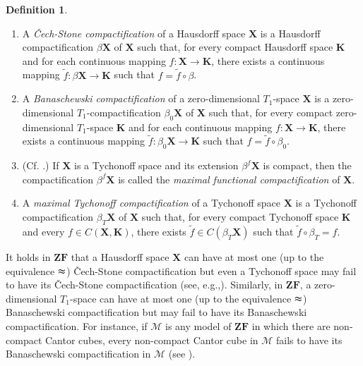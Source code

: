 \documentclass[12pt,twoside,leqno]{article}
\theoremstyle{plain}
\theoremstyle{definition}
\newtheorem{definition}[theorem]{Definition}
\theoremstyle{remark}
\begin{document}
\begin{definition}
	\label{s1:d24}
	\begin{enumerate}
		\item[(i)] A \emph{\v{C}ech-Stone compactification} of a Hausdorff space $\mathbf{X}$ is a Hausdorff
		compactification $\beta \mathbf{X}$ of $\mathbf{X}$ such that, for
		every compact Hausdorff space $\mathbf{K}$ and for each continuous mapping $%
		f:\mathbf{X}\rightarrow \mathbf{K}$, there exists a continuous mapping $\tilde{f}:\beta
		\mathbf{X}\rightarrow \mathbf{K}$ such that $f=\tilde{f}\circ \beta $.
		
		\item[(ii)]  A \emph{Banaschewski compactification} of a zero-dimensional $T_1$-space $\mathbf{X}$ is a zero-dimen\-sional
		$T_1$-compactification $ \beta_0 \mathbf{X} $ of $\mathbf{X}$ such that, for
		every compact zero-dimensional $T_1$-space $\mathbf{K}$ and for each continuous mapping $%
		f:\mathbf{X}\rightarrow \mathbf{K}$, there exists a continuous mapping $\tilde{f}:\beta_0
		\mathbf{X}\rightarrow \mathbf{K}$ such that $f=\tilde{f}\circ \beta_0 $.
		
		\item[(iii)] (Cf. \cite{kw1}.) If $\mathbf{X}$ is a Tychonoff space and its extension $\beta^{f}\mathbf{X}$ is compact, then the compactification $\beta^{f}\mathbf{X}$ is called the \emph{maximal functional compactification} of $\mathbf{X}$.
		
		\item[(iv)] A \emph{maximal Tychonoff compactification} of a Tychonoff space $\mathbf{X}$ is a Tychonoff compactification $\beta_{T}\mathbf{X}$ of $\mathbf{X}$ such that, for every compact Tychonoff space $\mathbf{K}$ and every $f\in C(\mathbf{X},\mathbf{K})$, there exists $\tilde{f}\in C(\beta_T\mathbf{X})$ such that $\tilde{f}\circ\beta_T=f$.
	\end{enumerate}
\end{definition}

It holds in $\mathbf{ZF}$ that a Hausdorff space $\mathbf{X}$ can have at most one (up to the equivalence $\thickapprox$) \v{C}ech-Stone compactification but even a Tychonoff space may fail to have its \v{C}ech-Stone compactification (see, e.g.,\cite{kw1}).  Similarly, in $\mathbf{ZF}$, a zero-dimensional $T_1$-space can have at most one (up to the equivalence $\thickapprox$) Banaschewski compactification but may fail to have its Banaschewski compactification. For instance, if $\mathcal{M}$ is any model of $\mathbf{ZF}$ in which there are non-compact Cantor cubes, every non-compact Cantor cube in $\mathcal{M}$ fails to have its Banaschewski compactification in $\mathcal{M}$ (see \cite[Proposition 3.17]{kw1}).
\end{document}
